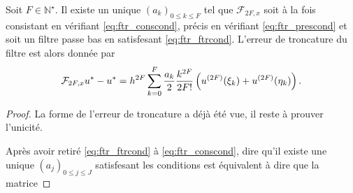 \begin{theoreme}
Soit $F \in \mathbb{N}^{\star}$. Il existe un unique $(a_k)_{0 \leq k \leq F}$ tel que $\mathcal{F}_{2F,x}$ soit à la fois consistant en vérifiant \eqref{eq:ftr_conscond}, précis en vérifiant \eqref{eq:ftr_prescond} et soit un filtre passe bas en satisfesant \eqref{eq:ftr_ftrcond}. L'erreur de troncature du filtre est alors donnée par 
\begin{equation}
\mathcal{F}_{2F,x}u^* - u^* = h^{2F} \displaystyle\sum\limits_{k=0}^F \dfrac{a_k}{2} \dfrac{k^{2F}}{2F!} \left( u^{(2F)}(\xi_k) + u^{(2F)}(\eta_k) \right).
\end{equation}
\label{prop:filter_def}
\end{theoreme}

\begin{proof}
La forme de l'erreur de troncature a déjà été vue, il reste à prouver l'unicité.

Après avoir retiré \eqref{eq:ftr_ftrcond} à \eqref{eq:ftr_conscond}, dire qu'il existe une unique $(a_j)_{0 \leq j \leq J}$ satisfesant les conditions est équivalent à dire que la matrice


\end{proof}
